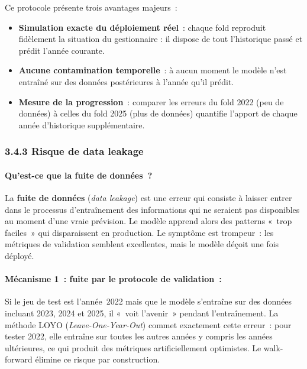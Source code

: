 Ce protocole présente trois avantages majeurs~:

\begin{itemize}
    \item \textbf{Simulation exacte du déploiement réel}~: chaque fold reproduit
    fidèlement la situation du gestionnaire : il dispose de tout l'historique passé
    et prédit l'année courante.
    \item \textbf{Aucune contamination temporelle}~: à aucun moment le modèle n'est
    entraîné sur des données postérieures à l'année qu'il prédit.
    \item \textbf{Mesure de la progression}~: comparer les erreurs du fold 2022 (peu
    de données) à celles du fold 2025 (plus de données) quantifie l'apport de chaque
    année d'historique supplémentaire.
\end{itemize}

\subsubsection*{3.4.3 \quad Risque de data leakage}

\paragraph{Qu'est-ce que la fuite de données~?}

La \textbf{fuite de données} (\textit{data leakage}) est une erreur qui consiste à
laisser entrer dans le processus d'entraînement des informations qui ne seraient pas
disponibles au moment d'une vraie prévision. Le modèle apprend alors des patterns
«~trop faciles~» qui disparaissent en production. Le symptôme est trompeur~: les
métriques de validation semblent excellentes, mais le modèle déçoit une fois déployé.

\paragraph{Mécanisme 1~: fuite par le protocole de validation~:}

Si le jeu de test est l'année~2022 mais que le modèle s'entraîne sur des données
incluant 2023, 2024 et 2025, il «~voit l'avenir~» pendant l'entraînement. La méthode
LOYO (\textit{Leave-One-Year-Out}) commet exactement cette erreur~: pour tester 2022,
elle entraîne sur toutes les autres années y compris les années ultérieures, ce qui
produit des métriques artificiellement optimistes. Le walk-forward élimine ce risque
par construction.

